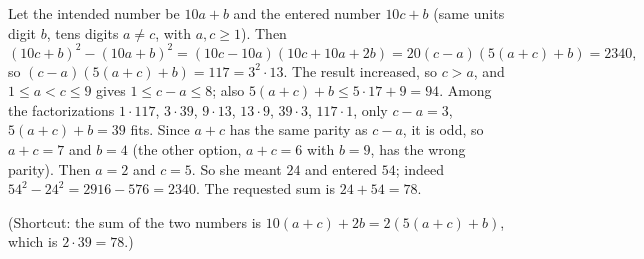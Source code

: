 Let the intended number be $10a+b$ and the entered number $10c+b$ (same units digit $b$, tens digits $a\ne c$, with $a,c\ge1$). Then
\[(10c+b)^2-(10a+b)^2=\left(10c-10a\right)\left(10c+10a+2b\right)=20(c-a)\left(5(a+c)+b\right)=2340,\]
so $(c-a)\left(5(a+c)+b\right)=117=3^2\cdot13$. The result increased, so $c>a$, and $1\le a<c\le9$ gives $1\le c-a\le8$; also $5(a+c)+b\le5\cdot17+9=94$. Among the factorizations $1\cdot117$, $3\cdot39$, $9\cdot13$, $13\cdot9$, $39\cdot3$, $117\cdot1$, only $c-a=3$, $5(a+c)+b=39$ fits. Since $a+c$ has the same parity as $c-a$, it is odd, so $a+c=7$ and $b=4$ (the other option, $a+c=6$ with $b=9$, has the wrong parity). Then $a=2$ and $c=5$.
So she meant $24$ and entered $54$; indeed $54^2-24^2=2916-576=2340$. The requested sum is $24+54=\boxed{78}$.

(Shortcut: the sum of the two numbers is $10(a+c)+2b=2\left(5(a+c)+b\right)$, which is $2\cdot39=78$.)
